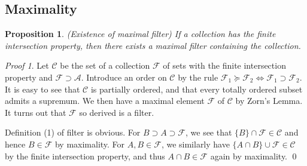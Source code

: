 \documentclass[a4paper,12pt]{article}
\newtheorem{prp}[thm]{Proposition}
\theoremstyle{remark}
\newtheorem*{prf}{Proof}
\theoremstyle{definition}
\newtheorem{rem}[thm]{Remark}
\theoremstyle{definition}
\theoremstyle{definition}
\begin{document}

\subsection{Maximality}

\begin{prp}\label{existence maximal filter} (Existence of maximal filter)
	If a collection has the finite intersection property, then there exists a maximal filter containing the collection.
\end{prp}
\begin{prf}
	Let \( \mathscr{C} \) be the set of a collection \( \mathscr{F} \) of sets with the finite intersection property and \( \mathscr{F} \supset \mathscr{A} \). Introduce an order on \( \mathscr{C} \) by the rule \( \mathscr{F}_1 \succeq \mathscr{F}_2 \iff \mathscr{F}_1 \supset \mathscr{F}_2\).
	It is easy to see that \( \mathscr{C} \) is partially ordered, and that every totally ordered subset admits a supremum. We then have a maximal element \( \mathscr{F} \) of \( \mathscr{C} \) by Zorn's Lemma.
	It turns out that \( \mathscr{F} \) so derived is a filter.

	Definition (1) of filter is obvious.
	For \( B \supset A \supset \mathscr{F} \), we see that \( \{B\}\cap \mathscr{F} \in \mathscr{C} \) and hence \( B \in \mathscr{F} \) by maximality.
	For \( A, B \in \mathscr{F} \), we similarly have \( \{A \cap B\} \cup \mathscr{F} \in \mathscr{C} \) by the finite intersection property, and thus \( A \cap B \in \mathscr{F} \) again by maximality.
	\qed\end{prf}

\end{document}
